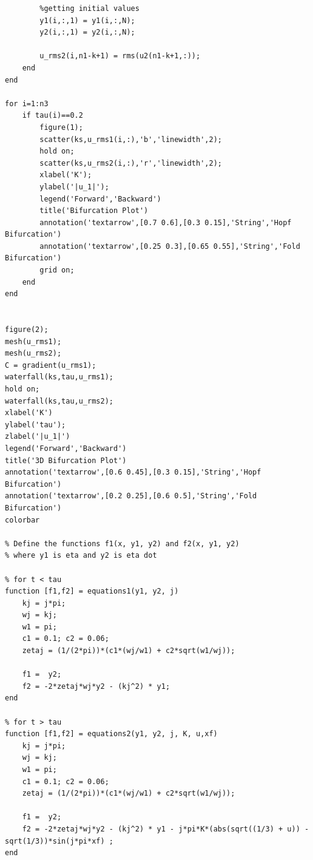 \documentclass[8pt]{article} %
\begin{document}
\begin{lstlisting}
        %getting initial values
        y1(i,:,1) = y1(i,:,N);
        y2(i,:,1) = y2(i,:,N);
 
        u_rms2(i,n1-k+1) = rms(u2(n1-k+1,:));
    end
end

for i=1:n3
    if tau(i)==0.2
        figure(1);
        scatter(ks,u_rms1(i,:),'b','linewidth',2);
        hold on;
        scatter(ks,u_rms2(i,:),'r','linewidth',2);
        xlabel('K');
        ylabel('|u_1|');
        legend('Forward','Backward')
        title('Bifurcation Plot')
        annotation('textarrow',[0.7 0.6],[0.3 0.15],'String','Hopf Bifurcation')
        annotation('textarrow',[0.25 0.3],[0.65 0.55],'String','Fold Bifurcation')
        grid on;
    end
end


figure(2);
mesh(u_rms1);
mesh(u_rms2);
C = gradient(u_rms1);
waterfall(ks,tau,u_rms1);
hold on;
waterfall(ks,tau,u_rms2);
xlabel('K')
ylabel('tau');
zlabel('|u_1|')
legend('Forward','Backward')
title('3D Bifurcation Plot')
annotation('textarrow',[0.6 0.45],[0.3 0.15],'String','Hopf Bifurcation')
annotation('textarrow',[0.2 0.25],[0.6 0.5],'String','Fold Bifurcation')
colorbar

% Define the functions f1(x, y1, y2) and f2(x, y1, y2) 
% where y1 is eta and y2 is eta dot

% for t < tau
function [f1,f2] = equations1(y1, y2, j)
    kj = j*pi;
    wj = kj;
    w1 = pi;
    c1 = 0.1; c2 = 0.06;
    zetaj = (1/(2*pi))*(c1*(wj/w1) + c2*sqrt(w1/wj));
    
    f1 =  y2;
    f2 = -2*zetaj*wj*y2 - (kj^2) * y1;
end

% for t > tau
function [f1,f2] = equations2(y1, y2, j, K, u,xf)
    kj = j*pi;
    wj = kj;
    w1 = pi;
    c1 = 0.1; c2 = 0.06;
    zetaj = (1/(2*pi))*(c1*(wj/w1) + c2*sqrt(w1/wj));

    f1 =  y2;
    f2 = -2*zetaj*wj*y2 - (kj^2) * y1 - j*pi*K*(abs(sqrt((1/3) + u)) - sqrt(1/3))*sin(j*pi*xf) ;
end
\end{lstlisting}
\end{document}
